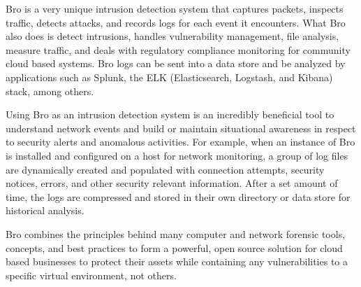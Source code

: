 \documentclass[./main.tex]{subfiles}
\begin{document}
Bro is a very unique intrusion detection system that captures packets, inspects traffic, detects attacks, and records logs for each event it encounters. What Bro also does is detect intrusions, handles vulnerability management, file analysis, measure traffic, and deals with regulatory compliance monitoring for community cloud based systems. Bro logs can be sent into a data store and be analyzed by applications such as Splunk, the ELK (Elasticsearch, Logstash, and Kibana) stack, among others.

Using Bro as an intrusion detection system is an incredibly beneficial tool to understand network events and build or maintain situational awareness in respect to security alerts and anomalous activities. For example, when an instance of Bro is installed and configured on a host for network monitoring, a group of log files are dynamically created and populated with connection attempts, security notices, errors, and other security relevant information. After a set amount of time, the logs are compressed and stored in their own directory or data store for historical analysis.

Bro combines the principles behind many computer and network forensic tools, concepts, and best practices to form a powerful, open source solution for cloud based businesses to protect their assets while containing any vulnerabilities to a specific virtual environment, not others.
\end{document}
